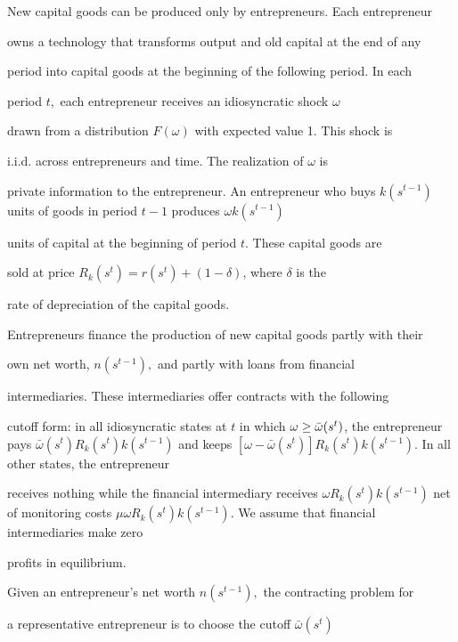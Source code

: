\documentclass[fleqn,leqno,11pt]{article}
\begin{document}
New capital goods can be produced only by entrepreneurs. Each entrepreneur

owns a technology that transforms output and old capital at the end of any

period into capital goods at the beginning of the following period. In each

period $t,$ each entrepreneur receives an idiosyncratic shock $\omega $

drawn from a distribution $F(\omega )$ with expected value 1. This shock is

i.i.d. across entrepreneurs and time. The realization of $\omega $ is

private information to the entrepreneur. An entrepreneur who buys $%

k(s^{t-1}) $ units of goods in period $t-1$ produces $\omega k(s^{t-1})$

units of capital at the beginning of period $t.$ These capital goods are

sold at price $R_{k}(s^{t})=r(s^{t})+(1-\delta )$, where $\delta $ is the

rate of depreciation of the capital goods.



Entrepreneurs finance the production of new capital goods partly with their

own net worth, $n(s^{t-1}),$ and partly with loans from financial

intermediaries. These intermediaries offer contracts with the following

cutoff form: in all idiosyncratic states at $t$ in which $\omega \geq \bar{%

\omega}(s^{t})$, the entrepreneur pays $\bar{\omega}%

(s^{t})R_{k}(s^{t})k(s^{t-1})$ and keeps $[\omega -\bar{\omega}%

(s^{t})]R_{k}(s^{t})k(s^{t-1}).$ In all other states, the entrepreneur

receives nothing while the financial intermediary receives $\omega

R_{k}(s^{t})k(s^{t-1})$ net of monitoring costs $\mu \omega

R_{k}(s^{t})k(s^{t-1}).$ We assume that financial intermediaries make zero

profits in equilibrium.



Given an entrepreneur's net worth $n(s^{t-1}),$ the contracting problem for

a representative entrepreneur is to choose the cutoff $\bar{\omega}(s^{t})$
\end{document}
